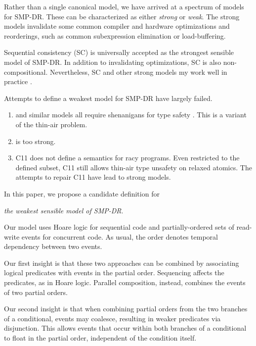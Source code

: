 Rather than a single canonical model, we have arrived at a spectrum of models
for SMP-DR.  These can be characterized as either \emph{strong} or
\emph{weak}.  The strong models invalidate some common compiler and hardware
optimizations and reorderings, such as common subexpression elimination or
load-buffering.

Sequential consistency (SC) \citep{Lamport:1979:MMC:1311099.1311750} is
universally accepted as the strongest sensible model of SMP-DR.  In addition
to invalidating optimizations, SC is also non-compositional.  Nevertheless,
SC and other strong models my work well in practice
\cite{Singh:2012:ESC:2337159.2337220,Dolan:2018:BDR:3192366.3192421,Ou:2018:TUC:3288538.3276506,Liu:2019:ASC:3314221.3314611}.

Attempts to define a weakest model for SMP-DR have largely failed.
\begin{enumerate}
\item \citet{Manson:2005:JMM:1047659.1040336} and similar models
  \cite{DBLP:conf/esop/JagadeesanPR10,DBLP:conf/popl/KangHLVD17} all require
  shenanigans for type safety
  \cite{DBLP:journals/toplas/Lochbihler13,DBLP:conf/tldi/GotoJPR12}.  This is
  a variant of the thin-air problem.
\item \citet{DBLP:conf/lics/JeffreyR16} is too strong.
\item C11 does not define a semantics for racy programs.  Even restricted to
  the defined subset, C11 still allows thin-air type unsafety on relaxed
  atomics. The attempts to repair C11 have lead to strong models.
\end{enumerate}

In this paper, we propose a candidate definition for
\begin{center}
  \emph{the weakest sensible model of SMP-DR}.
\end{center}

Our model uses Hoare logic for sequential code and partially-ordered sets of
read-write events for concurrent code.  As usual, the order denotes temporal
dependency between two events.

Our first insight is that these two approaches can be combined by associating
logical predicates with events in the partial order.  Sequencing affects the
predicates, as in Hoare logic.  Parallel composition, instead, combines the
events of two partial orders.

Our second insight is that when combining partial orders from the two
branches of a conditional, events may coalesce, resulting in weaker
predicates via disjunction.  This allows events that occur within both
branches of a conditional to float in the partial order, independent of the
condition itself.

